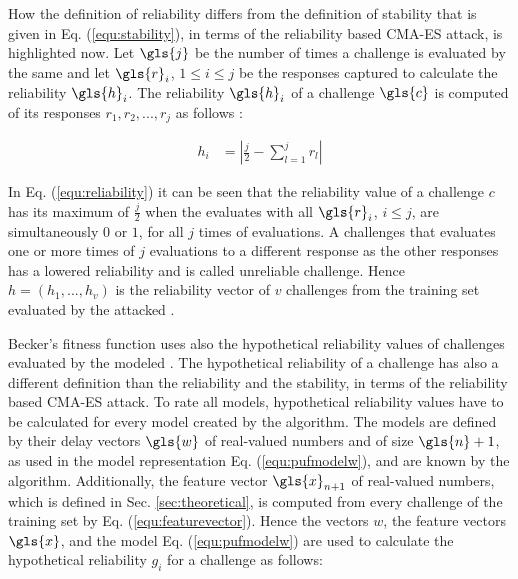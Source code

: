 How the definition of reliability differs from the definition of stability that is given in Eq. (\ref{equ:stability}), in terms of the reliability based \ac{CMA-ES} attack, is highlighted now.
Let $\gls{j}$ be the number of times a challenge is evaluated by the same \puf and let $\gls{r}_i$, $1 \le i \le j$ be the responses captured to calculate the reliability $\gls{h}_i$.
The reliability $\gls{h}_i$ of a challenge $\gls{c}$ is computed of its responses $r_1, r_2, ..., r_j$ as follows \cite{Becker2015ThePUFs}:

\begin{align}
h_i &= |\frac{j}{2} - \sum_{l = 1}^{j}r_l| \label{equ:reliability}
\end{align}


In Eq. (\ref{equ:reliability}) it can be seen that the reliability value of a challenge $c$ has its maximum of $\frac{j}{2}$ when the \puf evaluates with all $\gls{r}_i$, $i \le j$, are simultaneously $0$ or $1$, for all $j$ times of evaluations. %
A challenges that evaluates one or more times of $j$ evaluations to a different response as the other responses has a lowered reliability and is called unreliable challenge.
Hence $h = (h_1, ..., h_v)$ is the reliability vector of $v$ challenges from the training set evaluated by the attacked \puf.

Becker's fitness function uses also the hypothetical reliability values of challenges evaluated by the modeled \pufs.
The hypothetical reliability of a challenge has also a different definition than the reliability and the stability, in terms of the reliability based \ac{CMA-ES} attack.
To rate all models, hypothetical reliability values have to be calculated for every model created by the algorithm.
The models are defined by their delay vectors $\gls{w}$ of real-valued numbers and of size $\gls{n} + 1$, as used in the \apuf model representation Eq. (\ref{equ:pufmodelw}), and are known by the algorithm. %
Additionally, the feature vector $\gls{x}_{n+1}$ of real-valued numbers, which is defined in Sec. \ref{sec:theoretical}, is computed from every challenge of the training set by Eq. (\ref{equ:featurevector}).
Hence the vectors $w$, the feature vectors $\gls{x}$, and the \apuf model Eq. (\ref{equ:pufmodelw}) are used to calculate the hypothetical reliability $g_i$ for a challenge as follows:

